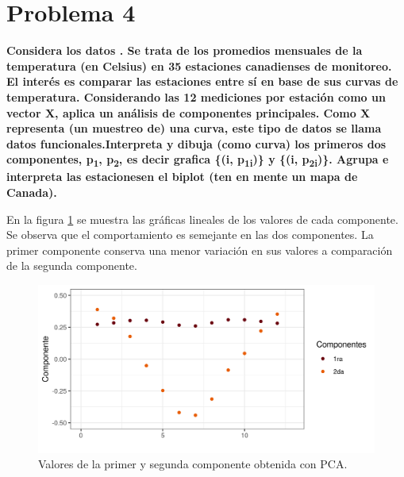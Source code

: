 \section*{Problema 4}

\textbf{Considera los datos . Se trata de los promedios mensuales de la temperatura (en Celsius) en 35 estaciones canadienses de monitoreo. El interés es comparar las estaciones entre sí en base de sus curvas de temperatura. Considerando las 12 mediciones por estación como un vector X, aplica un análisis de componentes principales. Como X representa (un muestreo de) una curva, este tipo de datos se llama datos funcionales.Interpreta y dibuja (como curva) los primeros dos componentes, p\textsubscript{1}, p\textsubscript{2}, es decir grafica \{(i, p\textsubscript{1i})\} y \{(i, p\textsubscript{2i})\}. Agrupa e interpreta las estacionesen el biplot (ten en mente un mapa de Canada).}

En la figura \ref{fig:components} se muestra las gráficas lineales de los valores de cada componente. Se observa que el comportamiento es semejante en las dos componentes. La primer componente conserva una menor variación en sus valores a comparación de la segunda componente.

\begin{figure}[H]
    \centering
    \includegraphics[width=13cm]{Graphics/components.png}
    \caption{Valores de la primer y segunda componente obtenida con PCA.}
    \label{fig:components}
\end{figure}

